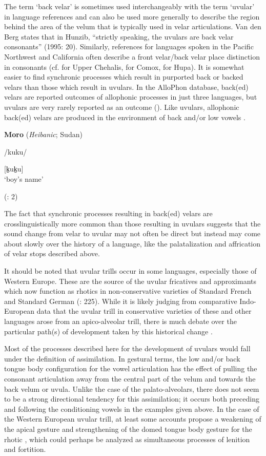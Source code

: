   The term ‘back velar’ is sometimes used interchangeably with the term ‘uvular’ in language references and can also be used more generally to describe the region behind the area of the velum that is typically used in velar articulations. Van den Berg states that in Hunzib, “strictly speaking, the uvulars are back velar consonants” (1995: 20). Similarly, references for languages spoken in the Pacific Northwest and California often describe a front velar/back velar place distinction in consonants (cf. \citealt{Kinkade1963} for Upper Chehalis, \citealt{Harris1981} for Comox, \citealt{Golla1970} for Hupa). It is somewhat easier to find synchronic processes which result in purported back or backed velars than those which result in uvulars. In the AlloPhon database, back(ed) velars are reported outcomes of allophonic processes in just three languages, but uvulars are very rarely reported as an outcome (\citealt{BybeeEasterday2019}). Like uvulars, allophonic back(ed) velars are produced in the environment of back and/or low vowels .

\ea\label{ex:4.41}
  \textbf{Moro} (\textit{Heibanic}; Sudan)

/kuku/

[k̠uk̠u]\\
\glt ‘boy’s name’

(\citealt{BlackBlack1971}: 2)
\z

  The fact that synchronic processes resulting in back(ed) velars are crosslinguistically more common than those resulting in uvulars suggests that the sound change from velar to uvular may not often be direct but instead may come about slowly over the history of a language, like the palatalization and affrication of velar stops described above.

  It should be noted that uvular trills occur in some languages, especially those of Western Europe. These are the source of the uvular fricatives and approximants which now function as rhotics in non-conservative varieties of Standard French and Standard German (\citealt{LadefogedMaddieson1996}: 225). While it is likely judging from comparative Indo-European data that the uvular trill in conservative varieties of these and other languages arose from an apico-alveolar trill, there is much debate over the particular path(s) of development taken by this historical change \citep{Schiller1999}.

  Most of the processes described here for the development of uvulars would fall under the definition of assimilation. In gestural terms, the low and/or back tongue body configuration for the vowel articulation has the effect of pulling the consonant articulation away from the central part of the velum and towards the back velum or uvula. Unlike the case of the palato-alveolars, there does not seem to be a strong directional tendency for this assimilation; it occurs both preceding and following the conditioning vowels in the examples given above. In the case of the Western European uvular trill, at least some accounts propose a weakening of the apical gesture and strengthening of the domed tongue body gesture for the rhotic \citep{Schiller1999}, which could perhaps be analyzed as simultaneous processes of lenition and fortition.

